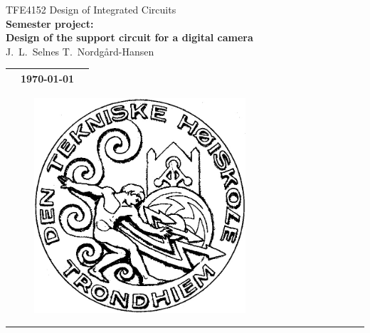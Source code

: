\documentclass[a4paper, 12pt, english]{article}
\begin{document}
\begin{minipage}[c]{0.85\textwidth}
  \huge \centering
  TFE4152 Design of Integrated Circuits\\
  \vspace{1ex}
  \huge \textbf{
    Semester project:\\
    Design of the support circuit for a digital camera
  }\\
  \vspace{1ex}
  \Large
  J.~L.~Selnes T.~Nordgård-Hansen
  \vspace{3ex}
  
  \normalsize
  
  \begin{tabular}{p{} p{} p{}}
    \toprule
    & \today\\
    \bottomrule
  \end{tabular}
\end{minipage}

\begin{figure}[H]
  \centering
  \includegraphics[width=0.7\textwidth]{figures/logo.png}
\end{figure}


\newpage
\setlength{\parskip}{0ex}
\renewcommand{\baselinestretch}{0.1}\normalsize
\onehalfspacing
\tableofcontents
\singlespacing
\renewcommand{\baselinestretch}{1.00}\normalsize
\setlength{\parskip}{2ex}
\rule{\textwidth}{1pt}
\end{document}
